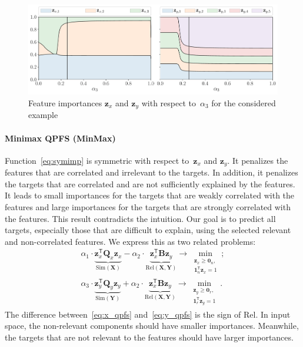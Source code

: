 \documentclass[preprint,authoryear,12pt]{elsarticle}
\theoremstyle{definition}
\newcommand{\bz}{\mathbf{z}}
\newcommand{\bY}{\mathbf{Y}}
\newcommand{\bX}{\mathbf{X}}
\newcommand{\bQ}{\mathbf{Q}}
\newcommand{\T}{\mathsf{T}}
\newcommand{\bOne}{\boldsymbol{1}}
\newcommand{\bZero}{\boldsymbol{0}}
\begin{document}
\begin{figure}
	\centering
	\includegraphics[width=\linewidth]{features_vs_alpha.pdf}
	\caption{Feature importances $\bz_x$ and $\bz_y$ with respect to~$\alpha_3$ for the considered example}
	\label{fig:features_vs_alpha}
\end{figure}

\paragraph{Minimax QPFS (MinMax)}
Function~\eqref{eq:symimp} is symmetric with respect to~$\bz_x$ and $\bz_y$.
It penalizes the features that are correlated and irrelevant to the targets.
In addition, it penalizes the targets that are correlated and are not sufficiently explained by the features.
It leads to small importances for the targets that are weakly correlated with the features and large importances for the targets that are strongly correlated with the features.
This result contradicts the intuition.
Our goal is to predict all targets, especially those that are difficult to explain, using the selected relevant and non-correlated features. We express this as two related problems:
\begin{align}
\alpha_1 \cdot \underbrace{\bz_x^{\T} \bQ_x \bz_x}_{\text{Sim}(\bX)} - \alpha_2 \cdot \underbrace{ \bz_x^{\T}\mathbf{B} \bz_y}_{\text{Rel}(\bX, \bY)} \rightarrow \min_{\substack{\bz_x \geq \bZero_n, \\ \bOne_n^{\T}\bz_x=1}};
\label{eq:x_qpfs}\\
\alpha_3 \cdot \underbrace{\bz_y^{\T} \bQ_y \bz_y}_{\text{Sim}(\bY)} + \alpha_2 \cdot \underbrace{ \bz_x^{\T} \mathbf{B} \bz_y}_{\text{Rel}(\bX, \bY)} \rightarrow \min_{\substack{\bz_y \geq \bZero_r,  \\ \bOne_r^{\T}\bz_y=1}}.
\label{eq:y_qpfs}
\end{align}
The difference between~\eqref{eq:x_qpfs} and~\eqref{eq:y_qpfs} is the sign of Rel.
In input space, the non-relevant components should have smaller importances.
Meanwhile, the targets that are not relevant to the features should have larger importances.
\end{document}
